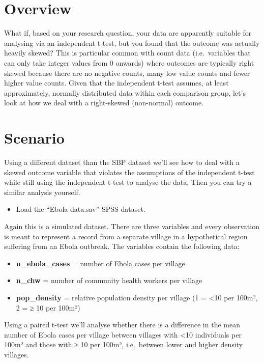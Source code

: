 \documentclass[
]{book}
\providecommand{\tightlist}{%
  \setlength{\itemsep}{0pt}\setlength{\parskip}{0pt}}
\begin{document}
\hypertarget{overview-11}{%
\section{Overview}\label{overview-11}}

What if, based on your research question, your data are apparently suitable for analysing via an independent t-test, but you found that the outcome was actually heavily skewed? This is particular common with count data (i.e.~variables that can only take integer values from 0 onwards) where outcomes are typically right skewed because there are no negative counts, many low value counts and fewer higher value counts. Given that the independent t-test assumes, at least approximately, normally distributed data within each comparison group, let's look at how we deal with a right-skewed (non-normal) outcome.

\hypertarget{scenario-8}{%
\section{Scenario}\label{scenario-8}}

Using a different dataset than the SBP dataset we'll see how to deal with a skewed outcome variable that violates the assumptions of the independent t-test while still using the independent t-test to analyse the data. Then you can try a similar analysis yourself.

\begin{itemize}
\tightlist
\item
  Load the ``Ebola data.sav'' SPSS dataset.
\end{itemize}

Again this is a simulated dataset. There are three variables and every observation is meant to represent a record from a separate village in a hypothetical region suffering from an Ebola outbreak. The variables contain the following data:

\begin{itemize}
\tightlist
\item
  \textbf{n\_ebola\_cases} = number of Ebola cases per village
\item
  \textbf{n\_chw} = number of community health workers per village
\item
  \textbf{pop\_density} = relative population density per village (1 = \textless10 per 100m², 2 = ≥ 10 per 100m²)
\end{itemize}

Using a paired t-test we'll analyse whether there is a difference in the mean number of Ebola cases per village between villages with \textless10 individuals per 100m² and those with ≥ 10 per 100m², i.e.~between lower and higher density villages.
\end{document}
